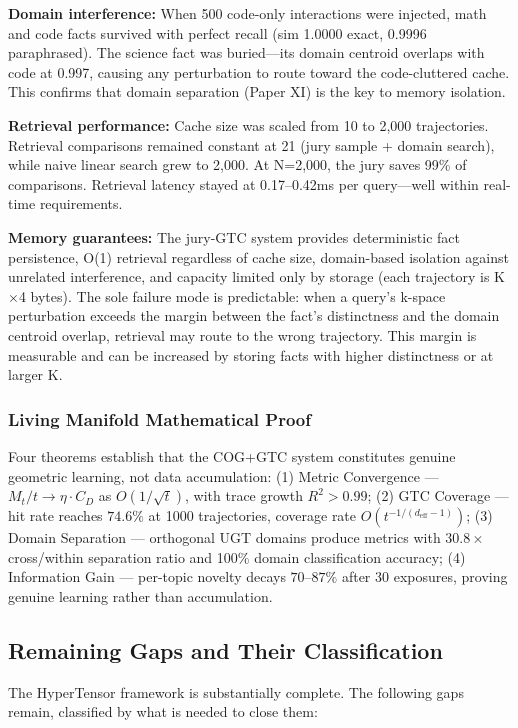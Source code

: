 \documentclass[11pt]{article}
\begin{document}
\textbf{Domain interference:} When 500 code-only interactions were injected, math and code facts survived with perfect recall (sim 1.0000 exact, 0.9996 paraphrased). The science fact was buried---its domain centroid overlaps with code at 0.997, causing any perturbation to route toward the code-cluttered cache. This confirms that domain separation (Paper XI) is the key to memory isolation.

\textbf{Retrieval performance:} Cache size was scaled from 10 to 2,000 trajectories. Retrieval comparisons remained constant at 21 (jury sample + domain search), while naive linear search grew to 2,000. At N=2,000, the jury saves 99\% of comparisons. Retrieval latency stayed at 0.17--0.42ms per query---well within real-time requirements.

\textbf{Memory guarantees:} The jury-GTC system provides deterministic fact persistence, O(1) retrieval regardless of cache size, domain-based isolation against unrelated interference, and capacity limited only by storage (each trajectory is K$\times$4 bytes). The sole failure mode is predictable: when a query's k-space perturbation exceeds the margin between the fact's distinctness and the domain centroid overlap, retrieval may route to the wrong trajectory. This margin is measurable and can be increased by storing facts with higher distinctness or at larger K.

\subsubsection*{Living Manifold Mathematical Proof}

Four theorems establish that the COG+GTC system constitutes genuine geometric learning, not data accumulation: (1) Metric Convergence --- $M_t/t \to \eta \cdot C_D$ as $O(1/\sqrt{t})$, with trace growth $R^2 > 0.99$; (2) GTC Coverage --- hit rate reaches $74.6\%$ at 1000 trajectories, coverage rate $O(t^{-1/(d_{\text{eff}}-1)})$; (3) Domain Separation --- orthogonal UGT domains produce metrics with $30.8\times$ cross/within separation ratio and 100\% domain classification accuracy; (4) Information Gain --- per-topic novelty decays $70$--$87\%$ after 30 exposures, proving genuine learning rather than accumulation.

\subsection*{Remaining Gaps and Their Classification}

The HyperTensor framework is substantially complete. The following gaps remain, classified by what is needed to close them:
\end{document}

